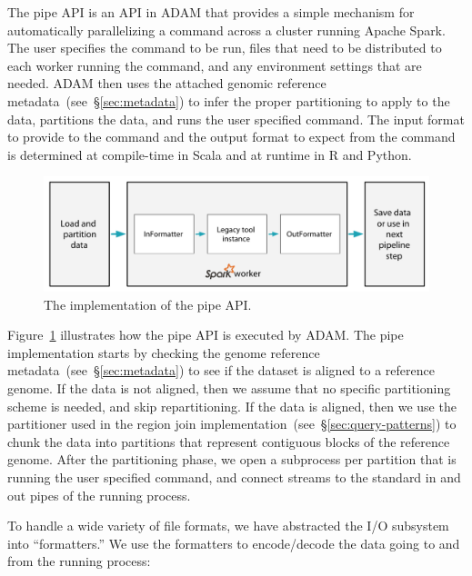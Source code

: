 \documentclass[phd]{ucbthesis}
\begin{document}
The {pipe} API is an API in {ADAM} that provides a simple
mechanism for automatically parallelizing a command across a cluster running
{Apache Spark}. The user specifies the command to be run, files that need
to be distributed to each worker running the command, and any environment
settings that are needed. {ADAM} then uses the attached genomic reference
metadata~(see~\S\ref{sec:metadata}) to infer the proper partitioning to apply to
the data, partitions the data, and runs the user specified command. The input
format to provide to the command and the output format to expect from the
command is determined at compile-time in {Scala} and at runtime in R and
{Python}.

\begin{figure}[h]
\begin{center}
\includegraphics[width=0.95\linewidth]{graphs/pipe.pdf}
\end{center}
\caption{The implementation of the {pipe} API.}
\label{fig:pipe}
\end{figure}

Figure~\ref{fig:pipe} illustrates how the {pipe} API is executed by
{ADAM}. The {pipe} implementation starts by checking the genome
reference metadata~(see~\S\ref{sec:metadata}) to see if the dataset is aligned
to a reference genome. If the data is not aligned, then we assume that no
specific partitioning scheme is needed, and skip repartitioning. If the data is
aligned, then we use the partitioner used in the region join
implementation~(see~\S\ref{sec:query-patterns}) to chunk the data into
partitions that represent contiguous blocks of the reference genome. After the
partitioning phase, we open a subprocess per partition that is running the user
specified command, and connect streams to the standard in and out pipes of the
running process.

To handle a wide variety of file formats, we have abstracted the I/O subsystem
into ``formatters.'' We use the formatters to encode/decode the data going to
and from the running process:
\end{document}
